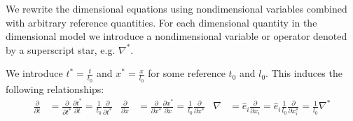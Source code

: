 \documentclass[letterpaper,11pt,nointlimits,reqno]{amsart}
\begin{document}
We rewrite the dimensional equations using nondimensional variables
combined with arbitrary reference quantities.  For each dimensional
quantity in the dimensional model we introduce a nondimensional variable
or operator denoted by a superscript star, e.g. $\nabla^{*}$.

We introduce $t^{*}=\frac{t}{t_{0}}$ and $x^{*}=\frac{x}{l_{0}}$ for some
reference $t_{0}$ and $l_{0}$.  This induces the following relationships:
\begin{align}
  \frac{\partial{}}{\partial{}t}
  &=
  \frac{\partial{}}{\partial{}t^{*}}
  \frac{\partial{}t^{*}}{\partial{}t}
  =
  \frac{1}{t_{0}}\frac{\partial}{\partial{}t^{*}}
  &
  \frac{\partial{}}{\partial{}x}
  &=
  \frac{\partial{}}{\partial{}x^{*}}
  \frac{\partial{}x^{*}}{\partial{}x}
  =
  \frac{1}{l_{0}}\frac{\partial}{\partial{}x^{*}}
  &
  \nabla
  &=
  \hat{e}_{i} \frac{\partial{}}{\partial{}x_{i}}
  =
  \hat{e}_{i} \frac{1}{l_{0}} \frac{\partial}{\partial{}x^{*}_{i}}
  =
  \frac{1}{l_{0}} \nabla^{*}
  \label{eq:nondim_derivops}
\end{align}
\end{document}
